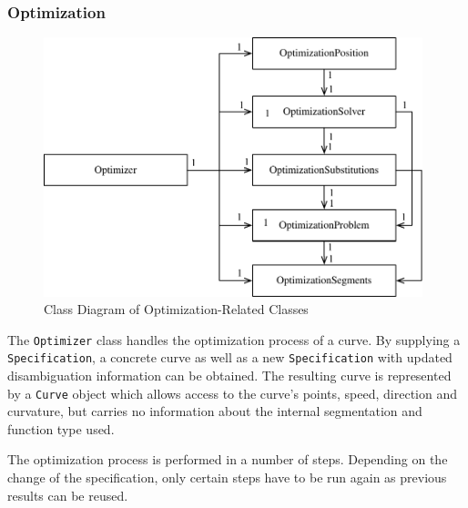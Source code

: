 \documentclass[a4paper]{article}
\begin{document}
				
				\subsubsection{Optimization}
					\begin{figure}[htb]
						\centering
						\includegraphics[width=110mm]{content/output/optimization_class_diagram.pdf}
						\caption{Class Diagram of Optimization-Related Classes}
						\label{figure:optimization_class_diagram}
					\end{figure}
					
					The \verb|Optimizer| class handles the optimization process of a curve. By supplying a \verb|Specification|, a concrete curve as well as a new \verb|Specification| with updated disambiguation information can be obtained. The resulting curve is represented by a \verb|Curve| object which allows access to the curve's points, speed, direction and curvature, but carries no information about the internal segmentation and function type used.
					
					The optimization process is performed in a number of steps. Depending on the change of the specification, only certain steps have to be run again as previous results can be reused.
					
\end{document}
